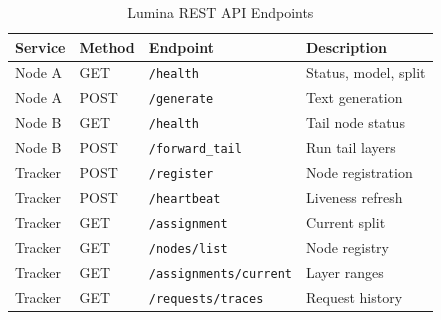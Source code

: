 \documentclass[conference]{IEEEtran}
\begin{document}
\begin{table}[htbp]
\centering
\caption{Lumina REST API Endpoints}
\label{tab:api}
\renewcommand{\arraystretch}{1.15}
\begin{tabular}{lllp{2.8cm}}
\toprule
\textbf{Service} & \textbf{Method} & \textbf{Endpoint} & \textbf{Description} \\
\midrule
Node A   & GET  & \texttt{/health}             & Status, model, split \\
Node A   & POST & \texttt{/generate}           & Text generation \\
Node B   & GET  & \texttt{/health}             & Tail node status \\
Node B   & POST & \texttt{/forward\_tail}      & Run tail layers \\
Tracker  & POST & \texttt{/register}           & Node registration \\
Tracker  & POST & \texttt{/heartbeat}          & Liveness refresh \\
Tracker  & GET  & \texttt{/assignment}         & Current split \\
Tracker  & GET  & \texttt{/nodes/list}         & Node registry \\
Tracker  & GET  & \texttt{/assignments/current}& Layer ranges \\
Tracker  & GET  & \texttt{/requests/traces}    & Request history \\
\bottomrule
\end{tabular}
\end{table}
\end{document}
